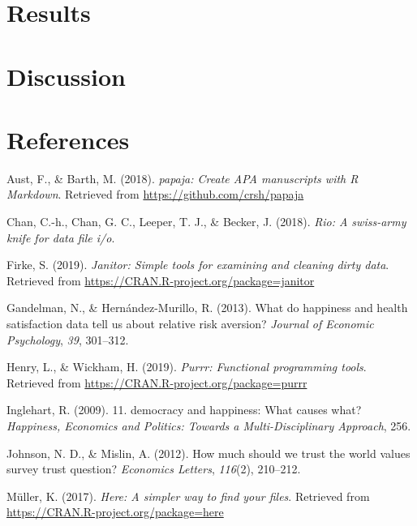 \documentclass[man]{apa6}
\begin{document}
\section{Results}\label{results}

\section{Discussion}\label{discussion}

\newpage

\section{References}\label{references}

\begingroup
\setlength{\parindent}{-0.5in} \setlength{\leftskip}{0.5in}

\hypertarget{refs}{}
\hypertarget{ref-R-papaja}{}
Aust, F., \& Barth, M. (2018). \emph{papaja: Create APA manuscripts with
R Markdown}. Retrieved from \url{https://github.com/crsh/papaja}

\hypertarget{ref-R-rio}{}
Chan, C.-h., Chan, G. C., Leeper, T. J., \& Becker, J. (2018).
\emph{Rio: A swiss-army knife for data file i/o}.

\hypertarget{ref-R-janitor}{}
Firke, S. (2019). \emph{Janitor: Simple tools for examining and cleaning
dirty data}. Retrieved from
\url{https://CRAN.R-project.org/package=janitor}

\hypertarget{ref-gandelman2013happiness}{}
Gandelman, N., \& Hernández-Murillo, R. (2013). What do happiness and
health satisfaction data tell us about relative risk aversion?
\emph{Journal of Economic Psychology}, \emph{39}, 301--312.

\hypertarget{ref-R-purrr}{}
Henry, L., \& Wickham, H. (2019). \emph{Purrr: Functional programming
tools}. Retrieved from \url{https://CRAN.R-project.org/package=purrr}

\hypertarget{ref-inglehart200911}{}
Inglehart, R. (2009). 11. democracy and happiness: What causes what?
\emph{Happiness, Economics and Politics: Towards a Multi-Disciplinary
Approach}, 256.

\hypertarget{ref-johnson2012much}{}
Johnson, N. D., \& Mislin, A. (2012). How much should we trust the world
values survey trust question? \emph{Economics Letters}, \emph{116}(2),
210--212.

\hypertarget{ref-R-here}{}
Müller, K. (2017). \emph{Here: A simpler way to find your files}.
Retrieved from \url{https://CRAN.R-project.org/package=here}
\end{document}
